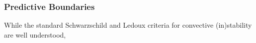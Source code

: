 {\color{brown}
\subsubsection{Predictive Boundaries}

While the standard Schwarzschild and Ledoux criteria for convective (in)stability are well understood, 

}